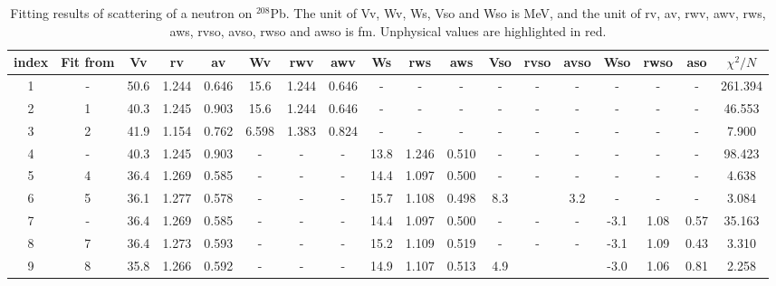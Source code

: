 \begin{landscape}
\begin{table}[b]
	\centering
	\caption{Fitting results of scattering of a neutron on $^{208}$Pb. 
			The unit of Vv, Wv, Ws, Vso and Wso is MeV, and the unit of rv, av, rwv, awv, rws, aws, rvso, avso, rwso and awso is fm. 
			Unphysical values are highlighted in red. }
	\label{neutron_table}
	\footnotesize
	\begin{tabular}{cccccccccccccccccc}
		\hline
		\hline
		index & Fit from & Vv   & rv    & av    & Wv    & rwv   & awv   & Ws   & rws   & aws   & Vso & rvso  & avso & Wso   & rwso & aso  & $\chi^2/N$ \\
		\hline
		1     & -        & 50.6 & 1.244 & 0.646 & 15.6  & 1.244 & 0.646 & -    & -     & -     & -   & -     & -    & -     & -    & -    & 261.394    \\
		2     & 1        & 40.3 & 1.245 & 0.903 & 15.6  & 1.244 & 0.646 & -    & -     & -     & -   & -     & -    & -     & -    & -    & 46.553     \\
		3     & 2        & 41.9 & 1.154 & 0.762 & 6.598 & 1.383 & 0.824 & -    & -     & -     & -   & -     & -    & -     & -    & -    & 7.900      \\
		4     & -        & 40.3 & 1.245 & 0.903 & -     & -     & -     & 13.8 & 1.246 & 0.510 & -   & -     & -    & -     & -    & -    & 98.423     \\
		5     & 4        & 36.4 & 1.269 & 0.585 & -     & -     & -     & 14.4 & 1.097 & 0.500 & -   & -     & -    & -     & -    & -    & 4.638      \\
		6     & 5        & 36.1 & 1.277 & 0.578 & -     & -     & -     & 15.7 & 1.108 & 0.498 & 8.3 & \color{red}{-4.3} & 3.2 & -     & -    & -    & 3.084      \\
		7     & -        & 36.4 & 1.269 & 0.585 & -     & -     & -     & 14.4 & 1.097 & 0.500 & -   & -     & -    & -3.1 & 1.08 & 0.57 & 35.163     \\
		8     & 7        & 36.4 & 1.273 & 0.593 & -     & -     & -     & 15.2 & 1.109 & 0.519 & -   & -     & -    & -3.1 & 1.09 & 0.43 & 3.310      \\
		9     & 8        & 35.8 & 1.266 & 0.592 & -     & -     & -     & 14.9 & 1.107 & 0.513 & 4.9 & \color{red}{1.03}  & \color{red}{1.23} & -3.0 & 1.06 & 0.81 & 2.258      \\
		\hline
		\hline
	\end{tabular}
\end{table}
\end{landscape}

